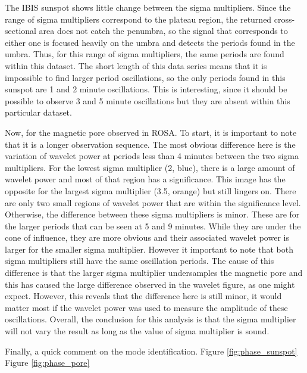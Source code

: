     The IBIS sunspot shows little change between the sigma multipliers.
    Since the range of sigma multipliers correspond to the plateau region, the returned cross-sectional area does not catch the penumbra, so the signal that corresponds to either one is focused heavily on the umbra and detects the periods found in the umbra.
    Thus, for this range of sigma multipliers, the same periods are found within this dataset.
    The short length of this data series means that it is impossible to find larger period oscillations, so the only periods found in this sunspot are 1 and 2 minute oscillations.
    This is interesting, since it should be possible to observe 3 and 5 minute oscillations but they are absent within this particular dataset.
       
    Now, for the magnetic pore observed in ROSA.
    To start, it is important to note that it is a longer observation sequence.
    The most obvious difference here is the variation of wavelet power at periods less than 4 minutes between the two sigma multipliers. 
    For the lowest sigma multiplier (2, blue), there is a large amount of wavelet power and most of that region has a significance. 
    This image has the opposite for the largest sigma multiplier (3.5, orange) but still lingers on.
    There are only two small regions of wavelet power that are within the significance level.
    Otherwise, the difference between these sigma multipliers is minor.
    These are for the larger periods that can be seen at 5 and 9 minutes.
    While they are under the cone of influence, they are more obvious and their associated wavelet power is larger for the smaller sigma multiplier.
    However it important to note that both sigma multipliers still have the same oscillation periods.
    The cause of this difference is that the larger sigma multiplier undersamples the magnetic pore and this has caused the large difference observed in the wavelet figure, as one might expect.
    However, this reveals that the difference here is still minor, it would matter most if the wavelet power was used to measure the amplitude of these oscillations.
    Overall, the conclusion for this analysis is that the sigma multiplier will not vary the result as long as the value of sigma multiplier is sound.

	Finally, a quick comment on the mode identification.
	Figure \ref{fig:phase_sunspot}
	Figure \ref{fig:phase_pore}
	
